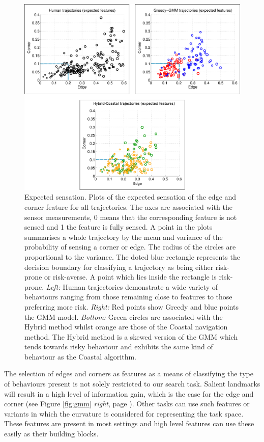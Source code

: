 \begin{figure}
  \centering
  \includegraphics[width=\textwidth]{./ch3-Search/Figures/Figure6} 
  \caption{Expected sensation. Plots of the expected sensation of the edge and corner feature for all trajectories. 
  The axes are associated with the 
  sensor measurements, 0 means that the corresponding feature is not sensed and 1 the feature is fully sensed. 
  A point in the plots summarises a whole trajectory by the mean and variance of the probability of sensing a corner or edge. 
  The radius of the circles are proportional to the variance. The doted blue rectangle represents the decision boundary 
  for classifying a trajectory as being either risk-prone or risk-averse. A point which lies inside the rectangle is risk-prone.
  \textit{Left:} Human trajectories demonstrate a wide variety of behaviours ranging from those remaining close to features 
  to those preferring more risk. 
  \textit{Right:} Red points show Greedy and blue points the GMM model. 
  \textit{Bottom:} Green circles are associated with the Hybrid method whilst orange are those of the 
  Coastal navigation method. The Hybrid method is a skewed version of the GMM which tends towards risky behaviour and exhibits the 
  same kind of behaviour as the Coastal algorithm.}
  \label{fig:expectedfeatures}
\end{figure}


The selection of edges and corners as features as a means of classifying the type of behaviours present 
is not solely restricted to our search task. Salient landmarks will result in a high level of information
gain, which is the case for the edge and corner (see Figure \ref{fig:gmm} \textit{right}, page \pageref{fig:gmm}).
Other tasks can use such features or variants in which the curvature is considered for representing the task space. 
These features are present in most settings and high level features can use these easily as their building blocks.

